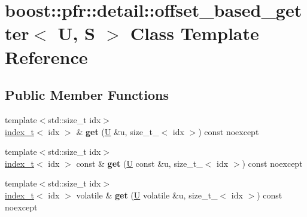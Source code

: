 \hypertarget{classboost_1_1pfr_1_1detail_1_1offset__based__getter}{}\section{boost\+:\+:pfr\+:\+:detail\+:\+:offset\+\_\+based\+\_\+getter$<$ U, S $>$ Class Template Reference}
\label{classboost_1_1pfr_1_1detail_1_1offset__based__getter}
\subsection*{Public Member Functions}
\begin{DoxyCompactItemize}
\item 
\mbox{\label{classboost_1_1pfr_1_1detail_1_1offset__based__getter_a78cc050ab68b1a1f76f42630674fc7ef}} 
{\footnotesize template$<$std\+::size\+\_\+t idx$>$ }\\\mbox{\hyperlink{structindex__t}{index\+\_\+t}}$<$ idx $>$ \& {\bfseries get} (\mbox{\hyperlink{union_u}{U}} \&u, size\+\_\+t\+\_\+$<$ idx $>$) const noexcept
\item 
\mbox{\label{classboost_1_1pfr_1_1detail_1_1offset__based__getter_a498fbf47effbf14ab121c18b5077cff1}} 
{\footnotesize template$<$std\+::size\+\_\+t idx$>$ }\\\mbox{\hyperlink{structindex__t}{index\+\_\+t}}$<$ idx $>$ const  \& {\bfseries get} (\mbox{\hyperlink{union_u}{U}} const \&u, size\+\_\+t\+\_\+$<$ idx $>$) const noexcept
\item 
\mbox{\label{classboost_1_1pfr_1_1detail_1_1offset__based__getter_a1ae209e7ff63f42888ae68aad5ba91a5}} 
{\footnotesize template$<$std\+::size\+\_\+t idx$>$ }\\\mbox{\hyperlink{structindex__t}{index\+\_\+t}}$<$ idx $>$ volatile \& {\bfseries get} (\mbox{\hyperlink{union_u}{U}} volatile \&u, size\+\_\+t\+\_\+$<$ idx $>$) const noexcept
\item 
\mbox{\label{classboost_1_1pfr_1_1detail_1_1offset__based__getter_ad56ff954ceb58d3f7cfbbf9fc9e49a7a}} 

\end{DoxyCompactItemize}
